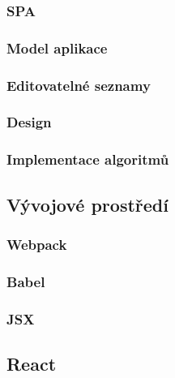 \documentclass[a4paper,11pt,titlepage,fleqn]{article}
\begin{document}
        \subsubsection{SPA}

        \subsubsection{Model aplikace}

        \subsubsection{Editovatelné seznamy}

        \subsubsection{Design}

        \subsubsection{Implementace algoritmů}

    \subsection{Vývojové prostředí}
        \subsubsection{Webpack}

        \subsubsection{Babel}
        \subsubsection{JSX}


    \subsection{React}
        
\end{document}
